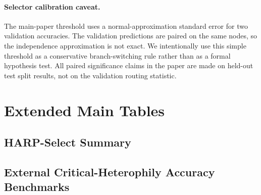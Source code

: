 \documentclass[10pt]{article}
\newcommand{\method}{HARP-Select}
\begin{document}
\paragraph{Selector calibration caveat.}
The main-paper threshold uses a normal-approximation standard error for two
validation accuracies.  The validation predictions are paired on the same
nodes, so the independence approximation is not exact.  We intentionally use
this simple threshold as a conservative branch-switching rule rather than as a
formal hypothesis test.  All paired significance claims in the paper are made
on held-out test split results, not on the validation routing statistic.

\section{Extended Main Tables}

\subsection{HARP-Select Summary}

\begin{table}[H]
\centering
\caption{\method{} summary over fixed splits.}
\resizebox{\textwidth}{!}{%

}
\end{table}

\begin{table}[H]
\centering
\caption{\method{} versus the strongest implemented non-HARP baseline on the original six fixed-split heterophily datasets.}

\end{table}

\begin{table}[H]
\centering
\caption{Robust split-level checks for \method{} on the original six fixed-split heterophily datasets.}
\resizebox{\textwidth}{!}{%

}
\end{table}

\subsection{External Critical-Heterophily Accuracy Benchmarks}

\begin{table}[H]
\centering
\caption{Full external critical-heterophily comparison including implemented non-HARP baselines and HARP branches.}
\resizebox{\textwidth}{!}{%

}
\end{table}
\end{document}
